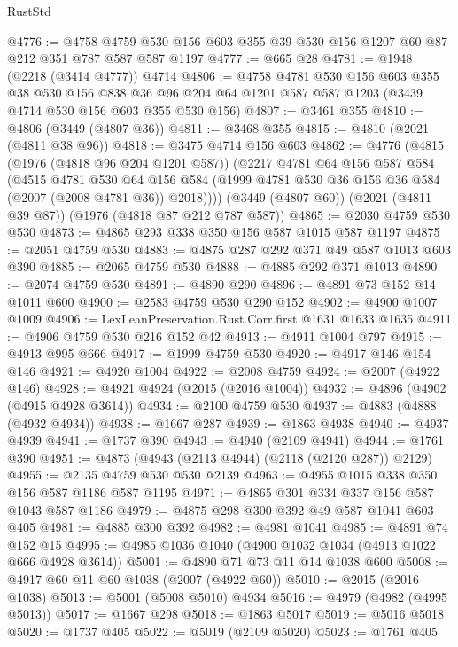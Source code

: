 \begin{lexlean}{RustStd}
\begin{coremodule}
@4776 := @4758 @4759 @530 @156 @603 @355 @39 @530 @156 @1207 @60 @87 @212 @351 @787 @587 @587 @1197
@4777 := @665 @28
@4781 := @1948 (@2218 (@3414 @4777)) @4714
@4806 := @4758
    @4781
    @530
    @156
    @603
    @355
    @38
    @530
    @156
    @838
    @36
    @96
    @204
    @64
    @1201
    @587
    @587
    @1203
    (@3439 @4714 @530 @156 @603 @355 @530 @156)
@4807 := @3461 @355
@4810 := @4806 (@3449 (@4807 @36))
@4811 := @3468 @355
@4815 := @4810 (@2021 (@4811 @38 @96))
@4818 := @3475 @4714 @156 @603
@4862 := @4776
    (@4815
      (@1976 (@4818 @96 @204 @1201 @587))
      (@2217
        @4781
        @64
        @156
        @587
        @584
        (@4515
          @4781
          @530
          @64
          @156
          @584
          (@1999 @4781 @530 @36 @156 @36 @584 (@2007 (@2008 @4781 @36)) @2018))))
    (@3449 (@4807 @60))
    (@2021 (@4811 @39 @87))
    (@1976 (@4818 @87 @212 @787 @587))
@4865 := @2030 @4759 @530 @530
@4873 := @4865 @293 @338 @350 @156 @587 @1015 @587 @1197
@4875 := @2051 @4759 @530
@4883 := @4875 @287 @292 @371 @49 @587 @1013 @603 @390
@4885 := @2065 @4759 @530
@4888 := @4885 @292 @371 @1013
@4890 := @2074 @4759 @530
@4891 := @4890 @290
@4896 := @4891 @73 @152 @14 @1011 @600
@4900 := @2583 @4759 @530 @290 @152
@4902 := @4900 @1007 @1009
@4906 := LexLeanPreservation.Rust.Corr.first @1631 @1633 @1635
@4911 := @4906 @4759 @530 @216 @152 @42
@4913 := @4911 @1004 @797
@4915 := @4913 @995 @666
@4917 := @1999 @4759 @530
@4920 := @4917 @146 @154 @146
@4921 := @4920 @1004
@4922 := @2008 @4759
@4924 := @2007 (@4922 @146)
@4928 := @4921 @4924 (@2015 (@2016 @1004))
@4932 := @4896 (@4902 (@4915 @4928 @3614))
@4934 := @2100 @4759 @530
@4937 := @4883 (@4888 (@4932 @4934))
@4938 := @1667 @287
@4939 := @1863 @4938
@4940 := @4937 @4939
@4941 := @1737 @390
@4943 := @4940 (@2109 @4941)
@4944 := @1761 @390
@4951 := @4873 (@4943 (@2113 @4944) (@2118 (@2120 @287)) @2129)
@4955 := @2135 @4759 @530 @530 @2139
@4963 := @4955 @1015 @338 @350 @156 @587 @1186 @587 @1195
@4971 := @4865 @301 @334 @337 @156 @587 @1043 @587 @1186
@4979 := @4875 @298 @300 @392 @49 @587 @1041 @603 @405
@4981 := @4885 @300 @392
@4982 := @4981 @1041
@4985 := @4891 @74 @152 @15
@4995 := @4985 @1036 @1040 (@4900 @1032 @1034 (@4913 @1022 @666 @4928 @3614))
@5001 := @4890 @71 @73 @11 @14 @1038 @600
@5008 := @4917 @60 @11 @60 @1038 (@2007 (@4922 @60))
@5010 := @2015 (@2016 @1038)
@5013 := @5001 (@5008 @5010) @4934
@5016 := @4979 (@4982 (@4995 @5013))
@5017 := @1667 @298
@5018 := @1863 @5017
@5019 := @5016 @5018
@5020 := @1737 @405
@5022 := @5019 (@2109 @5020)
@5023 := @1761 @405

\end{coremodule}
\end{lexlean}

